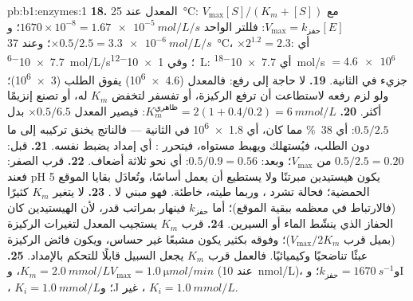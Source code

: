 \begin{solution}{pb:b1:enzymes:1}
\textbf{18.} المعدل عند \qty{25}{\celsius}: $V_{\max}[S]/(K_m + [S])$
مع $V_{\max} = k_{\text{حفز}}[E]$: فللتر الواحد
$1670\times 10^{-8} =
\qty{1.67e-5}{mol/L/s}$؛
و$\times 0.5/2.5 = \qty{3.3e-6}{mol/L/s}$؛ وعند \qty{37}{\celsius}،
$\times 2^{1.2} = 2.3$: أي \qty{7.7e-6}{mol/L/s}؛ وفي
\qty{1e-12}{L}: أي \qty{7.7e-18}{mol/s} $= \num{4.6e6}$ جزيء في
الثانية.
\textbf{19.} لا حاجة إلى رفع: فالمعدل (\num{4.6e6}) يفوق الطلب
(\num{3e6})؛ ولو لزم رفعه لاستطاعت  أن ترفع الركيزة، أو تفسفر
 لتخفض $K_m$ له، أو تصنع إنزيمًا أكثر.
\textbf{20.} $K_m^{\text{ظاهري}} = 2(1 + 0.4/0.2) = \qty{6}{mmol/L}$:
فيصير المعدل $\times 0.5/6.5$ بدل $0.5/2.5$: أي \qty{38}{\%} مما كان،
أي \num{1.8e6} في الثانية --- فالناتج يخنق تركيبه إلى ما دون الطلب،
فيُستهلك ويهبط مستواه، فيتحرر : أي إمداد يضبط نفسه.
\textbf{21.} قبل: $0.5/2.5 = 0.20$ من $V_{\max}$؛ وبعد:
$0.5/0.9 =
0.56$: أي نحو ثلاثة أضعاف.
\textbf{22.} قرب الصفر: فعند pH 5 يكون هيستيدين  مبرتنًا
ولا يستطيع أن يعمل أساسًا، وتُعادَل بقايا الموقع الحمضية؛ فحالة تشرد
، وربما طيته، خاطئة. فهو مبني  لا .
\textbf{23.} لا يتغير $K_m$ كثيرًا (فالارتباط في معظمه ببقية الموقع)؛
أما $k_{\text{حفز}}$ فينهار بمراتب قدر، لأن الهيستيدين كان 
الحفاز الذي ينشّط الماء أو السيرين.
\textbf{24.} قرب $K_m$ يستجيب المعدل لتغيرات الركيزة (بميل قرب
$V_{\max}/2K_m$)؛ وفوقه بكثير يكون  مشبعًا غير حساس، ويكون
فائض الركيزة عبئًا تناضحيًا وكيميائيًا. فالعمل قرب $K_m$ يجعل السبيل
قابلًا للتحكم بالإمداد.
\textbf{25.} $K_m = \qty{2.0}{mmol/L}$، و$V_{\max} = \qty{1.0}{\micro mol/min}$
(عند  \qty{10}{nmol/L})، و$k_{\text{حفز}} = \qty{1670}{s^{-1}}$؛
وI ، $K_i = \qty{1.0}{mmol/L}$؛ وJ غير ، $K_i =
\qty{1.0}{mmol/L}$.
\end{solution}
